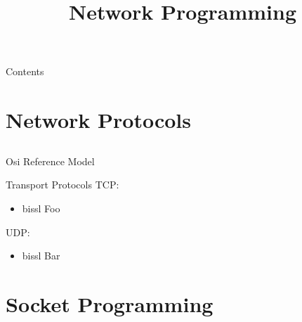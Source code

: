 
\newcommand{\topic}{%
    Network Programming
}

\title{\topic}
\supertitle{\course}
\date{}



\maketitle

\begin{frame}{Contents}
	\tableofcontents
\end{frame}

\section{Network Protocols}
\subsection{}

\begin{frame}{Osi Reference Model}
\end{frame}

\begin{frame}{Transport Protocols}
    TCP:
    \begin{itemize}
        \item bissl Foo
    \end{itemize}
    UDP:
    \begin{itemize}
        \item bissl Bar
    \end{itemize}
\end{frame}

\section{Socket Programming}
\subsection{}

